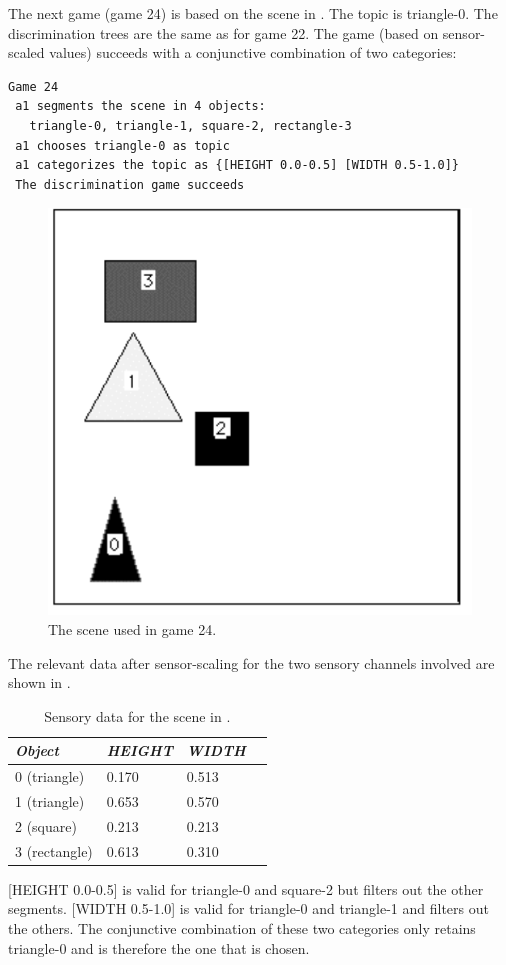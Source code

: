 The next game (game 24) is based on the scene in 
. The topic is triangle-0. 
The discrimination trees are the same as for
game 22. The game (based on sensor-scaled values)
succeeds with a conjunctive combination of two
categories: 
\begin{verbatim}
Game 24
 a1 segments the scene in 4 objects: 
   triangle-0, triangle-1, square-2, rectangle-3 
 a1 chooses triangle-0 as topic
 a1 categorizes the topic as {[HEIGHT 0.0-0.5] [WIDTH 0.5-1.0]}
 The discrimination game succeeds
\end{verbatim}
\begin{figure}[htbp]
  \centerline{\includegraphics[width=.40\textwidth]{chap4/figs/game24}}
\caption{\label{scene4} The scene used in game 24.}
\end{figure}
The relevant data after sensor-scaling for the 
two sensory channels involved are shown in . 
\begin{table}
\begin{center}
\begin{tabular}{| l | l | l | l |} \hline
{\it Object} & {\it HEIGHT} & {\it WIDTH} \\ \hline
0 (triangle) & 0.170 & 0.513  \\ \hline
1 (triangle) & 0.653 & 0.570 \\ \hline 
2 (square) & 0.213 & 0.213 \\ \hline 
3 (rectangle) & 0.613 & 0.310 \\ \hline 
\end{tabular}
\caption{\label{tab:t-game24} Sensory data for the scene in .}
\end{center}
\end{table}

[HEIGHT 0.0-0.5] is valid for triangle-0 and square-2 but
filters out the other segments. 
[WIDTH 0.5-1.0] is valid for triangle-0 and triangle-1 and 
filters out the others.  
The conjunctive combination of these two categories only 
retains triangle-0 and is therefore the one that is chosen. 

